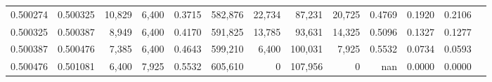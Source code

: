 \begin{tabular}{rrrrrrrrrrrrr}
0.500274 & 0.500325 &  10,829 & 6,400 &                                     0.3715 & 582,876 &  22,734 &  87,231 &  20,725 & 0.4769 & 0.1920 & 0.2106 \\
0.500325 & 0.500387 &   8,949 & 6,400 &                                     0.4170 & 591,825 &  13,785 &  93,631 &  14,325 & 0.5096 & 0.1327 & 0.1277 \\
0.500387 & 0.500476 &   7,385 & 6,400 &                                     0.4643 & 599,210 &   6,400 & 100,031 &   7,925 & 0.5532 & 0.0734 & 0.0593 \\
0.500476 & 0.501081 &   6,400 & 7,925 &                                     0.5532 & 605,610 &       0 & 107,956 &       0 &    nan & 0.0000 & 0.0000 \\
\bottomrule
\end{tabular}




